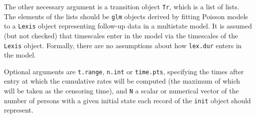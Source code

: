 \documentclass[a4paper,twoside,12pt]{report}
\begin{document}
The other necessary argument is a transition object \texttt{Tr}, which
is a list of lists. The elements of the lists should be \texttt{glm}
objects derived by fitting Poisson models to a \texttt{Lexis} object
representing follow-up data in a multistate model.  It is assumed (but
not checked) that timescales enter in the model via the timescales of
the \texttt{Lexis} object. Formally, there are no assumptions about
how \texttt{lex.dur} enters in the model.

Optional arguments are \texttt{t.range}, \texttt{n.int} or
\texttt{time.pts}, specifying the times after entry at which the
cumulative rates will be computed (the maximum of which will be taken
as the censoring time), and \texttt{N} a scalar or numerical vector of
the number of persons with a given initial state each record of the
\texttt{init} object should represent.
\end{document}
